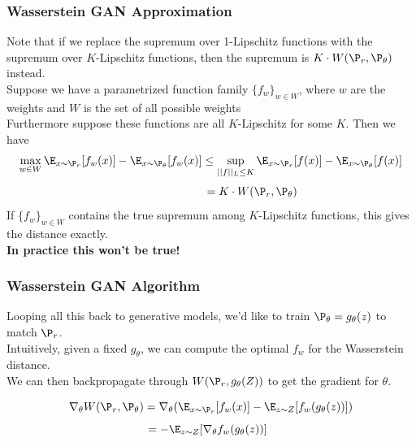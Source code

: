 \documentclass{beamer}
\begin{document}
\begin{frame}
\frametitle{Wasserstein GAN Approximation}
\pause
Note that if we replace the supremum over 1-Lipschitz functions with the supremum over $K$-Lipschitz functions, then the supremum is $K \cdot W(\P_{r},\P_{\theta})$ instead.\\
\pause
\vspace{0.12in}
Suppose we have a parametrized function family $\{f_{w}\}_{w \in W}$, where $w$ are the weights and $W$ is the set of all possible weights\\
\vspace{0.12in}
Furthermore suppose these functions are all $K$-Lipschitz for some $K$. \pause Then we have
\vspace{-0.07in}
$$\max_{w \in W} \E_{x \sim \P_{r}}[f_{w}(x)] - \E_{x \sim \P_{\theta}}[f_{w}(x)] \leq \sup_{||f||_{L} \leq K} \E_{x \sim \P_{r}}[f(x)] - \E_{x \sim \P_{\theta}}[f(x)]$$
$$ \hspace{1in}= K \cdot W(\P_{r},\P_{\theta})$$
\pause
If $\{f_{w}\}_{w \in W}$ contains the true supremum among $K$-Lipschitz functions, this gives the distance exactly.\\
\vspace{0.1in}
\pause
\textbf{In practice this won't be true!}


\end{frame}

\begin{frame}
\frametitle{Wasserstein GAN Algorithm}

Looping all this back to generative models, we'd like to train $\P_{\theta} = g_{\theta}(z)$ to match $\P_{r}$.\\
\vspace{0.12in}
\pause
Intuitively, given a fixed $g_{\theta}$, we can compute the optimal $f_{w}$ for the Wasserstein distance.\\
\pause
\vspace{0.12in}
We can then backpropagate through $W(\P_{r},g_{\theta}(Z))$ to get the gradient for $\theta$.

$$ \nabla_{\theta} W(\P_{r},\P_{\theta}) = \nabla_{\theta}(\E_{x \sim \P_{r}}[f_{w}(x)] - \E_{z\sim Z}[f_{w}(g_{\theta}(z))]) $$
$$ \hspace{-0.08in}= -\E_{z\sim Z}[\nabla_{\theta} f_{w}(g_{\theta}(z))] $$

\end{frame}
\end{document}

